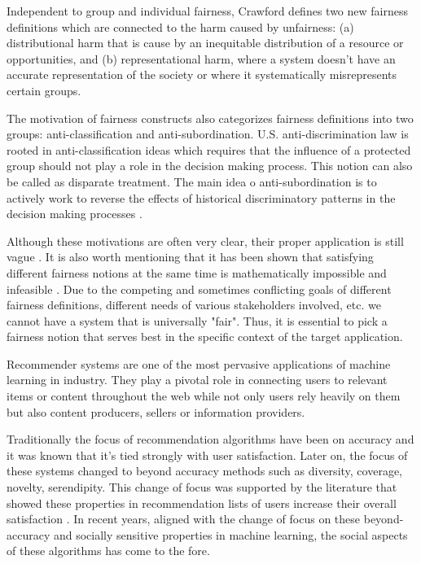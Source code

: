     
Independent to group and individual fairness, Crawford \cite{crawford2017trouble} defines two new fairness definitions which are connected to the harm caused by unfairness: (a) distributional harm that is cause by an inequitable distribution of a resource or opportunities, and (b) representational harm, where a system doesn't have an accurate representation of the society or where it systematically misrepresents certain groups.


The motivation of fairness constructs also categorizes fairness definitions into two groups: anti-classification and anti-subordination. U.S. anti-discrimination law is rooted in anti-classification ideas which requires that the influence of a protected group should not play a role in the decision making process. This notion can also be called as disparate treatment. The main idea o anti-subordination is to actively work to reverse the effects of historical discriminatory patterns in the decision making processes \cite{barocas2016big}.

Although these motivations are often very clear, their proper application is still vague \cite{xiang2019legal}. It is also worth mentioning that it has been shown that satisfying different fairness notions at the same time is mathematically impossible and infeasible \cite{Kleinberg:InherentTrade,chouldechova2017fair}. Due to the competing and sometimes conflicting goals of different fairness definitions, different needs of various stakeholders involved, etc. we cannot have a system that is universally "fair". Thus, it is essential to pick a fairness notion that serves best in the specific context of the target application. 


Recommender systems are one of the most pervasive applications of machine learning in industry. They play a pivotal role in connecting users to relevant items or content throughout the web while not only users rely heavily on them but also content producers, sellers or information providers.

Traditionally the focus of recommendation algorithms have been on accuracy and it was known that it's tied strongly with user satisfaction. Later on, the focus of these systems changed to beyond accuracy methods such as diversity, coverage, novelty, serendipity. This change of focus was supported by the literature that showed these properties in recommendation lists of users increase their overall satisfaction . In recent years, aligned with the change of focus on these beyond-accuracy and socially sensitive properties in machine learning, the social aspects of these algorithms has come to the fore.

